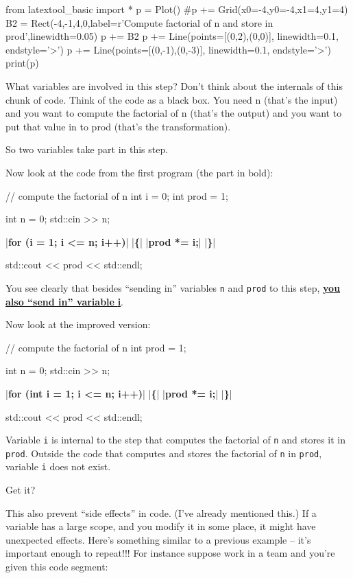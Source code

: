 \begin{python}
from latextool_basic import *
p = Plot()
#p += Grid(x0=-4,y0=-4,x1=4,y1=4)
B2 = Rect(-4,-1,4,0,label=r'Compute factorial of n and store in prod',linewidth=0.05)
p += B2
p += Line(points=[(0,2),(0,0)], linewidth=0.1, endstyle='>')
p += Line(points=[(0,-1),(0,-3)], linewidth=0.1, endstyle='>')
print(p)
\end{python}

What variables are involved in this step? Don't think about the internals of this chunk of code. Think of the code as a black box. You need n (that's the input) and you want to compute the factorial of n (that's the output) and you want to put that value in to prod (that's the transformation).

So two variables take part in this step.

Now look at the code from the first program (the part in bold):

\begin{consolethree}[escapeinside=||]
// compute the factorial of n
int i = 0;
int prod = 1;

int n = 0;
std::cin >> n;

|\textbf{for (i = 1; i <= n; i++)}|
|\textbf{\{}|
    |\textbf{prod *= i;}|
|\textbf{\}}|

std::cout << prod << std::endl; 
\end{consolethree}

You see clearly that besides ``sending in'' variables \texttt{n} and \texttt{prod} to this step, \underline{\textbf{you also ``send in'' variable }\textbf{i}}.

Now look at the improved version:

\begin{consolethree}[escapeinside=||]
// compute the factorial of n
int prod = 1;

int n = 0;
std::cin >> n;

|\textbf{for (int i = 1; i <= n; i++)}|
|\textbf{\{}|
    |\textbf{prod *= i;}|
|\textbf{\}}|

std::cout << prod << std::endl; 
\end{consolethree}

Variable \texttt{i} is internal to the step that computes the factorial of \texttt{n} and stores it in \texttt{prod}. Outside the code that computes and stores the factorial of \texttt{n} in \texttt{prod}, variable \texttt{i} does not exist.

Get it?

This also prevent ``side effects'' in code. (I've already mentioned this.) If a variable has a large scope, and you modify it in some place, it might have unexpected effects. Here's something similar to a previous example -- it's important enough to repeat!!! For instance suppose work in a team and you're given this code segment:

